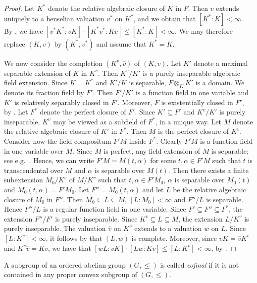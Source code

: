 \documentclass[12pt,leqno]{amsart}
\renewcommand{\leq}{\leqslant}
\numberwithin{equation}{section}
\theoremstyle{definition}
\theoremstyle{plain}
\begin{document}
\begin{proof}
Let $K^\ast$ denote the relative algebraic closure of $K$ in $F$.
Then $v$ extends uniquely to a henselian valuation $v^\ast$ on $K^\ast$, and we obtain that $[K^\ast:K]<\infty$.
By \cite[Theorem 3.3.4]{EP05}, we have $[v^\ast K^\ast:vK]\cdot [K^\ast v^\ast: Kv]\leq [K^\ast:K]<\infty$.
We may therefore replace $(K,v)$ by $(K^\ast,v^\ast)$ and assume that $K^\ast=K$.

We now consider the completion $(K^v,\hat{v})$ of $(K,v)$.
Let $K'$ denote a maximal separable extension of $K$ in $K^v$.
Then $K^v/K'$ is a purely inseparable algebraic field extension.
Since $K=K^\ast$ and $K'/K$ is separable, $F\otimes_K K'$ is a domain.
We denote its fraction field by $F'$.
Then $F'/K'$ is a function field in one variable and $K'$ is relatively separably closed in $F'$.
Moreover, $F$ is existentially closed in $F'$, by .
Let $F^\ast$ denote the perfect closure of $F'$.
Since $K'\subseteq F'$ and $K^v/K'$ is purely inseparable, $K^v$ may be viewed as a subfield of $F^\ast$, in a unique way. Let $M$ denote the relative algebraic closure of $K'$ in $F^\ast$.
Then $M$ is the perfect closure of $K^v$. 
Consider now the field compositum $F'M$ inside $F^\ast$. 
Clearly $F'M$ is a function field in one variable over $M$. 
Since $M$ is perfect, any field extension of $M$ is separable; see e.g.~\cite[Theorem 26.3]{Mat89}.
Hence, we can write $F'M=M(t,\alpha)$ for some $t,\alpha\in F'M$ such that $t$ is transcendental over $M$ and $\alpha$ is separable  over $M(t)$. 
Then there exists a finite subextension $M_0/K^v$ of $M/K^v$ such that $t,\alpha\in F'M_0$, $\alpha$ is separable over $M_0(t)$ and $M_0(t,\alpha) =F'M_0$. 
Let $F''=M_0(t,\alpha)$ and let $L$ be the relative algebraic closure of $M_0$ in $F''$. 
Then $M_0\subseteq L\subseteq M$, $[L:M_0]<\infty$ and $F''/L$ is separable.
Hence $F''/L$ is a regular function field in one variable. 
Since $F' \subseteq F'' \subseteq F^\ast$, the extension $F''/F'$ is purely inseparable.
Since $K^v\subseteq L\subseteq M$, the extension $L/K^v$ is purely inseparable. 
The valuation $\hat{v}$ on $K^v$ extends to a valuation $w$ on $L$.
Since $[L:K^v]<\infty$, it follows by  that $(L,w)$ is complete.
Moreover, since $vK=\hat{v}K^v$ and $K^v\hat{v}=Kv$, we have that $[wL:vK]\cdot [Lw:Kv]\leq [L:K^v]<\infty$,  by \cite[Theorem 3.3.4]{EP05}.
\end{proof}

A subgroup of an ordered abelian group $(G,\leq)$ is called \emph{cofinal} if it is not contained in any proper convex subgroup of $(G,\leq)$.
\end{document}
